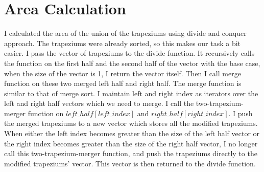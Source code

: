 \documentclass[a4paper,12pt]{article}
\begin{document}
\section{Area Calculation}
I calculated the area of the union of the trapeziums using divide and conquer approach. The trapeziums were already sorted,
so this makes our task a bit easier. I pass the vector of trapeziums to the divide function. It recursively calls the function on the first half and the second half 
of the vector with the base case, when the size of the vector is 1, I return the vector itself. Then I call merge function on these two merged left half and right half.
The merge function is similar to that of merge sort. I maintain left and right index as iterators over the left and right half vectors which we need to merge.
I call the two-trapezium-merger function on $left\_half[left\_index]$ and $right\_half[right\_index]$. I push the merged
trapeziums to a new vector which stores all the modified trapeziums. When either the left index becomes greater than the size of the left half vector
or the right index becomes greater than the size of the right half vector, I no longer call this two-trapezium-merger function, and push the trapeziums directly
to the modified trapeziums' vector. This vector is then returned to the divide function.
\clearpage
\end{document}
